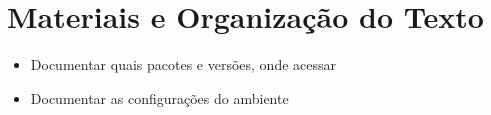 \section{Materiais e Organização do Texto}
\begin{itemize}
    \item Documentar quais pacotes e versões, onde acessar
    \item Documentar as configurações do ambiente
\end{itemize}